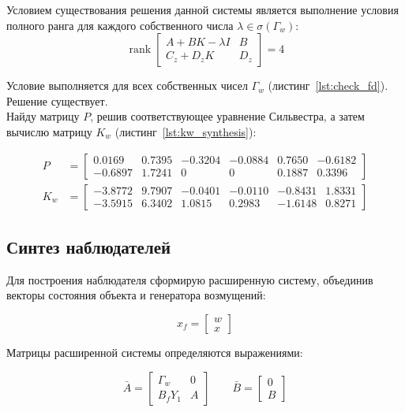 \documentclass[a4paper,12pt]{article}
\begin{document}
Условием существования решения данной системы является выполнение условия полного ранга для каждого собственного числа $\lambda \in \sigma(\Gamma_w)$:
\[
\operatorname{rank}
\begin{bmatrix}
	A + BK - \lambda I & B \\
	C_z + D_z K & D_z
\end{bmatrix}
= 4
\]

Условие выполняется для всех собственных чисел $\Gamma_w$ (листинг~\ref{lst:check_fd}). Решение существует.\\



Найду матрицу $P$, решив соответствующее уравнение Сильвестра, а затем вычислю матрицу $K_w$ (листинг~\ref{lst:kw_synthesis}):

\[
\begin{aligned}
	P &= \begin{bmatrix}
		0.0169 & 0.7395 & -0.3204 & -0.0884 & 0.7650 & -0.6182 \\
		-0.6897 & 1.7241 & 0 & 0 & 0.1887 & 0.3396
	\end{bmatrix} \\[5pt]
	K_w &= \begin{bmatrix}
		-3.8772 & 9.7907 & -0.0401 & -0.0110 & -0.8431 & 1.8331 \\
		-3.5915 & 6.3402 & 1.0815 & 0.2983 & -1.6148 & 0.8271
	\end{bmatrix}
\end{aligned}
\]

	

	
	
\subsection{Синтез наблюдателей}

Для построения наблюдателя сформирую расширенную систему, объединив векторы состояния объекта и генератора возмущений:

\[
x_f = \begin{bmatrix} w \\ x \end{bmatrix}
\]

Матрицы расширенной системы определяются выражениями:

\[
\bar{A} = \begin{bmatrix} \Gamma_w & 0 \\ B_f Y_1 & A \end{bmatrix} \qquad
\bar{B} = \begin{bmatrix} 0 \\ B \end{bmatrix}
\]
\end{document}
